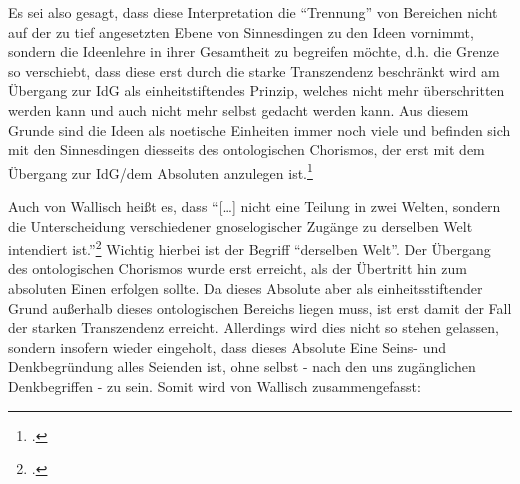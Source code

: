 Es sei also gesagt, dass diese Interpretation die \enquote{Trennung} von Bereichen nicht auf der zu tief angesetzten Ebene von Sinnesdingen zu den Ideen vornimmt, sondern die Ideenlehre in ihrer Gesamtheit zu begreifen möchte, d.h. die Grenze so verschiebt, dass diese erst durch die starke Transzendenz beschränkt wird am Übergang zur IdG als einheitstiftendes Prinzip, welches nicht mehr überschritten werden kann und auch nicht mehr selbst gedacht werden kann. Aus diesem Grunde sind die Ideen als noetische Einheiten immer noch viele und befinden sich mit den Sinnesdingen diesseits des ontologischen Chorismos, der erst mit dem Übergang zur IdG/dem Absoluten anzulegen ist.\footcite[][S. 17]{Wallisch}

Auch von Wallisch heißt es, dass \enquote{[\dots] nicht eine Teilung in zwei Welten, sondern die Unterscheidung verschiedener gnoselogischer Zugänge zu derselben Welt intendiert ist.}\footcite[vgl.][S. 15]{Wallisch}
Wichtig hierbei ist der Begriff \enquote{derselben Welt}. Der Übergang des ontologischen Chorismos wurde erst erreicht, als der Übertritt hin zum absoluten Einen erfolgen sollte. Da dieses Absolute aber als einheitsstiftender Grund außerhalb dieses ontologischen Bereichs liegen muss, ist erst damit der Fall der starken Transzendenz erreicht. Allerdings wird dies nicht so stehen gelassen, sondern insofern wieder eingeholt, dass dieses Absolute Eine Seins- und Denkbegründung alles Seienden ist, ohne selbst - nach den uns zugänglichen Denkbegriffen - zu sein. Somit wird von Wallisch zusammengefasst:
